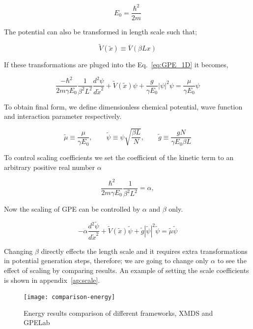 \documentclass[a4paper,times,hidelinks,12pt]{article}
\begin{document}
$$E_0 = \frac{\hbar^2}{2m} $$

\noindent The potential can also be transformed in length scale such that; 

$$ \widetilde{V}(\widetilde{x}) \equiv \overline{V}(\beta L x) $$ 

\noindent If these transformations are pluged into the Eq.~\eqref{eq:GPE_1D} it becomes,

\begin{equation}
    \label{eq:GPE_1D_dimensionless_en_len}
    \frac{-\hbar^2}{2m\gamma E_0} \frac{1}{\beta^2 L^2}  \frac{d^2\psi}{d \widetilde{x}^2} + \widetilde{V}(\widetilde{x})\psi + \frac{g}{\gamma E_0}|\psi|^2\psi = \frac{\mu}{\gamma E_0}\psi
\end{equation}

\noindent To obtain final form, we define dimensionless chemical potential, wave function and interaction parameter respectively. 

$$\widetilde{\mu} \equiv \frac{\mu}{\gamma E_0}, \qquad \widetilde{\psi} \equiv \psi{\sqrt{\frac{\beta L}{N}}}, \qquad \widetilde{g} \equiv \frac{gN}{\gamma E_0 \beta L} $$

\noindent To control scaling coefficients we set the coefficient of the kinetic term to an arbitrary positive real number $\alpha$  

$$ \frac{\hbar^2}{2m\gamma E_0} \frac{1}{\beta^2 L^2} = \alpha  , $$

\noindent Now the scaling of GPE can be controlled by $\alpha$ and $\beta$ only.

\begin{equation}
\label{eq:GPE_dimensionless}
    -\alpha\frac{d^2\widetilde{\psi}}{d\widetilde{x}^2} + \widetilde{V}(\widetilde{x})\widetilde{\psi} + \widetilde{g}|\widetilde{\psi}|^2 \widetilde{\psi} = \widetilde{\mu} \widetilde{\psi}
\end{equation}
    
Changing $\beta$ directly effects the length scale and it requires extra transformations in potential generation steps, therefore; we are going to change only $\alpha$ to see the effect of scaling by comparing results. An example of setting the scale coefficients is shown in appendix~\ref{ap:scale}.


\graphicspath{{"../figs/numericanalyze/"}}
\begin{figure}[H]
\centering
    \texttt{[image: comparison-energy]}
\caption{Energy results comparison of different frameworks, XMDS and GPELab}
\label{fig:dens_energy_error}
\end{figure}
\end{document}
